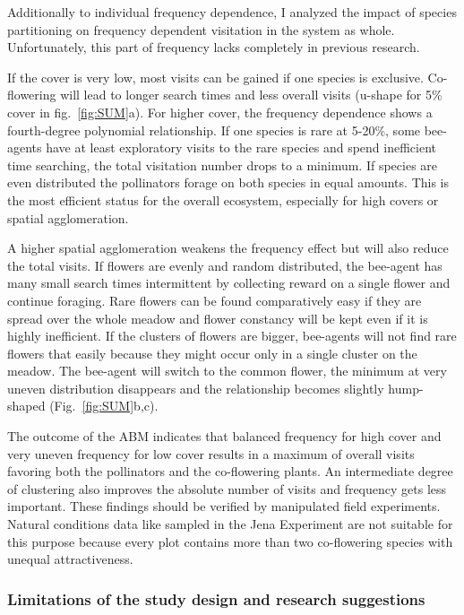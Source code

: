 Additionally to individual frequency dependence, I analyzed the impact of species partitioning on frequency dependent visitation in the system as whole. Unfortunately, this part of frequency lacks completely in previous research. 

If the cover is very low, most visits can be gained if one species is exclusive. Co-flowering will lead to longer search times and less overall visits (u-shape for 5\% cover in fig.~\ref{fig:SUM}a). For higher cover, the frequency dependence shows a fourth-degree polynomial relationship. If one species is rare at 5-20\%, some bee-agents have at least exploratory visits to the rare species and spend inefficient time searching, the total visitation number drops to a minimum. If species are even distributed the pollinators forage on both species in equal amounts. This is the most efficient status for the overall ecosystem, especially for high covers or spatial agglomeration. 

A higher spatial agglomeration weakens the frequency effect but will also reduce the total visits. If flowers are evenly and random distributed, the bee-agent has many small search times intermittent by collecting reward on a single flower and continue foraging. Rare flowers can be found comparatively easy if they are spread over the whole meadow and flower constancy will be kept even if it is highly inefficient. If the clusters of flowers are bigger, bee-agents will not find rare flowers that easily because they might occur only in a single cluster on the meadow. The bee-agent will switch to the common flower, the minimum at very uneven distribution disappears and the relationship becomes slightly hump-shaped (Fig.~\ref{fig:SUM}b,c). 

The outcome of the ABM indicates that balanced frequency for high cover and very uneven frequency for low cover results in a maximum of overall visits favoring both the pollinators and the co-flowering plants. An intermediate degree of clustering also improves the absolute number of visits and frequency gets less important. These findings should be verified by manipulated field experiments. Natural conditions data like sampled in the Jena Experiment are not suitable for this purpose because every plot contains more than two co-flowering species with unequal attractiveness.  


\subsubsection*{Limitations of the study design and research suggestions}

